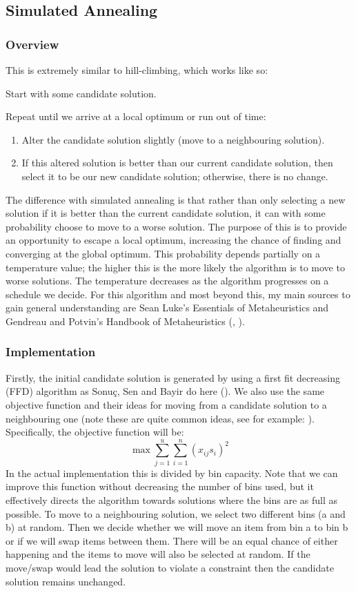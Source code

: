 \documentclass[12pt]{article}
\begin{document}
\subsection{Simulated Annealing}
\subsubsection{Overview}
This is extremely similar to hill-climbing, which works like so:

Start with some candidate solution.

Repeat until we arrive at a local optimum or run out of time:
\begin{enumerate}
\item Alter the candidate solution slightly (move to a neighbouring solution).
\item If this altered solution is better than our current candidate solution, then 
select it to be our new candidate solution; otherwise, there is no change.
\end{enumerate}

The difference with simulated annealing is that rather than only selecting a new solution if it is better than the current candidate solution, it can with some probability choose to move to a worse solution. The purpose of this is to provide an opportunity to escape a local optimum, increasing the chance of finding and converging at the global optimum. This probability depends partially on a temperature value; the higher this is the more likely the algorithm is to move to worse solutions. The temperature decreases as the algorithm progresses on a schedule we decide. For this algorithm and most beyond this, my main sources to gain general understanding are Sean Luke's Essentials of Metaheuristics and Gendreau and Potvin's Handbook of Metaheuristics (\cite{sean}, \cite{gendreau}).

\subsubsection{Implementation}
Firstly, the initial candidate solution is generated by using a first fit decreasing (FFD) algorithm as Sonuç, Sen and Bayir do here (\cite{sonuc}). We also use the same objective function and their ideas for moving from a candidate solution to a neighbouring one (note these are quite common ideas, see for example: \cite{kryz}). Specifically, the objective function will be:
\[
\max\sum_{j=1}^{u} \sum_{i=1}^{n} {(x_{ij} s_{i})}^{2}
\]
In the actual implementation this is divided by bin capacity. Note that we can improve this function without decreasing the number of bins used, but it effectively directs the algorithm towards solutions where the bins are as full as possible. To move to a neighbouring solution, we select two different bins (a and b) at random. Then we decide whether we will move an item from bin a to bin b or if we will swap items between them. There will be an equal chance of either happening and the items to move will also be selected at random. If the move/swap would lead the solution to violate a constraint then the candidate solution remains unchanged.
\end{document}
